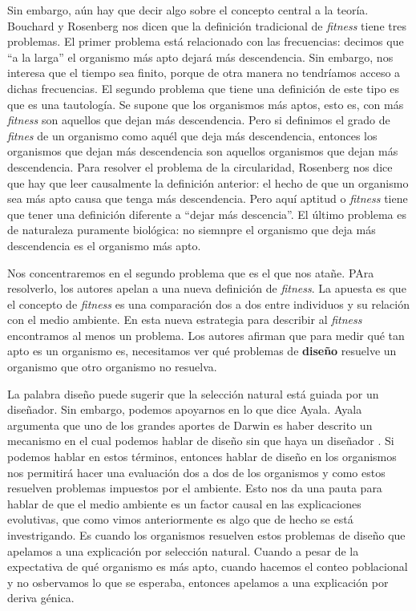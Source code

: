 Sin embargo, aún hay que decir algo sobre el concepto central a la teoría. Bouchard y Rosenberg \cite{Bouchard2004} nos dicen que la definición tradicional de \emph{fitness} tiene tres problemas. El primer problema está relacionado con las frecuencias: decimos que ``a la larga'' el organismo más apto dejará más descendencia. Sin embargo, nos interesa que el tiempo sea finito, porque de otra manera no tendríamos acceso a dichas frecuencias. El segundo problema que tiene una definición de este tipo es que es una tautología. Se supone que los organismos más aptos, esto es, con más \emph{fitness} son aquellos que dejan más descendencia. Pero si definimos el grado de \emph{fitnes} de un organismo como aquél que deja más descendencia, entonces los organismos que dejan más descendencia son aquellos organismos que dejan más descendencia. Para resolver el problema de la circularidad, Rosenberg nos dice que hay que leer causalmente la definición anterior: el hecho de que un organismo sea más apto causa que tenga más descendencia. Pero aquí aptitud o \emph{fitness} tiene que tener una definición diferente a ``dejar más descencia''. El último problema es de naturaleza puramente biológica: no siemnpre el organismo que deja más descendencia es el organismo más apto.

Nos concentraremos en el segundo problema que es el que nos atañe. PAra resolverlo, los autores apelan a una nueva definición de \emph{fitness}. La apuesta es que el concepto de \emph{fitness} es una comparación dos a dos entre individuos y su relación con el medio ambiente. En esta nueva estrategia para describir al \emph{fitness} encontramos al menos un problema. Los autores afirman que para medir qué tan apto es un organismo es, necesitamos ver qué problemas de \textbf{diseño} resuelve un organismo que otro organismo no resuelva.

La palabra diseño puede sugerir que la selección natural está guiada por un diseñador. Sin embargo, podemos apoyarnos en lo que dice Ayala. Ayala argumenta que uno de los grandes aportes de Darwin es haber descrito un mecanismo en el cual podemos hablar de diseño sin que haya un diseñador \cite{Ayala2004}. Si podemos hablar en estos términos, entonces hablar de diseño en los organismos nos permitirá hacer una evaluación dos a dos de los organismos y como estos resuelven problemas impuestos por el ambiente. Esto nos da una pauta para hablar de que el medio ambiente es un factor causal en las explicaciones evolutivas, que como vimos anteriormente es algo que de hecho se está investrigando. Es cuando los organismos resuelven estos problemas de diseño que apelamos a una explicación por selección natural. Cuando a pesar de la expectativa de qué organismo es más apto, cuando hacemos el conteo poblacional y no osbervamos lo que se esperaba, entonces apelamos a una explicación por deriva génica.

